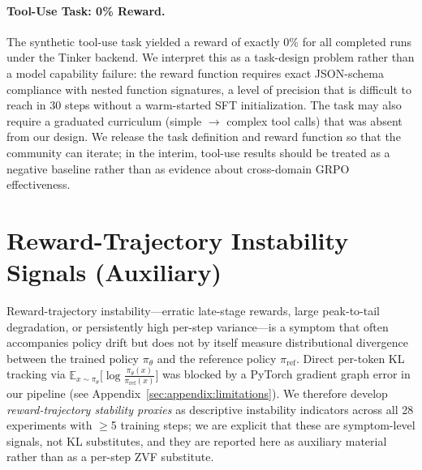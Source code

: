 \documentclass{article}
\begin{document}
\paragraph{Tool-Use Task: 0\% Reward.}
The synthetic tool-use task yielded a reward of exactly 0\% for all completed
runs under the Tinker backend. We interpret this as a task-design problem
rather than a model capability failure: the reward function requires exact
JSON-schema compliance with nested function signatures, a level of precision
that is difficult to reach in 30 steps without a warm-started SFT initialization.
The task may also require a graduated curriculum (simple $\to$ complex tool calls)
that was absent from our design. We release the task definition and reward
function so that the community can iterate; in the interim, tool-use results
should be treated as a negative baseline rather than as evidence about
cross-domain GRPO effectiveness.

\section{Reward-Trajectory Instability Signals (Auxiliary)}
\label{sec:appendix:instability}

Reward-trajectory instability---erratic late-stage rewards, large peak-to-tail
degradation, or persistently high per-step variance---is a symptom that often
accompanies policy drift but does not by itself measure distributional
divergence between the trained policy $\pi_\theta$ and the reference policy
$\pi_{\mathrm{ref}}$. Direct per-token KL tracking via $\mathbb{E}_{x \sim
\pi_\theta}\big[\log \frac{\pi_\theta(x)}{\pi_{\mathrm{ref}}(x)}\big]$ was
blocked by a PyTorch gradient graph error in our pipeline (see
Appendix~\ref{sec:appendix:limitations}). We therefore develop \emph{reward-trajectory
stability proxies} as descriptive instability indicators across all 28
experiments with $\geq$5 training steps; we are explicit that these are
symptom-level signals, not KL substitutes, and they are reported here as
auxiliary material rather than as a per-step ZVF substitute.
\end{document}
